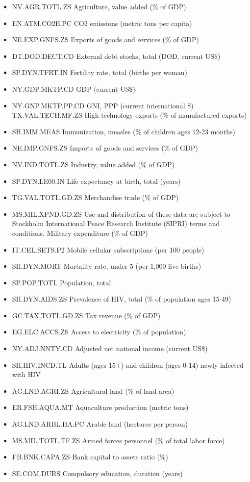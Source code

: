 \begin{itemize}
\tightlist
\item
  NV.AGR.TOTL.ZS Agriculture, value added (\% of GDP)
\item
  EN.ATM.CO2E.PC CO2 emissions (metric tons per capita)
\item
  NE.EXP.GNFS.ZS Exports of goods and services (\% of GDP)
\item
  DT.DOD.DECT.CD External debt stocks, total (DOD, current US\$)
\item
  SP.DYN.TFRT.IN Fertility rate, total (births per woman)
\item
  NY.GDP.MKTP.CD GDP (current US\$)
\item
  NY.GNP.MKTP.PP.CD GNI, PPP (current international \$)
  TX.VAL.TECH.MF.ZS High-technology exports (\% of manufactured exports)
\item
  SH.IMM.MEAS Immunization, measles (\% of children ages 12-23 months)
\item
  NE.IMP.GNFS.ZS Imports of goods and services (\% of GDP)
\item
  NV.IND.TOTL.ZS Industry, value added (\% of GDP)
\item
  SP.DYN.LE00.IN Life expectancy at birth, total (years)
\item
  TG.VAL.TOTL.GD.ZS Merchandise trade (\% of GDP)
\item
  MS.MIL.XPND.GD.ZS Use and distribution of these data are subject to Stockholm International Peace Research Institute (SIPRI) terms and conditions. Military expenditure (\% of GDP)
\item
  IT.CEL.SETS.P2 Mobile cellular subscriptions (per 100 people)
\item
  SH.DYN.MORT Mortality rate, under-5 (per 1,000 live births)
\item
  SP.POP.TOTL Population, total
\item
  SH.DYN.AIDS.ZS Prevalence of HIV, total (\% of population ages 15-49)
\item
  GC.TAX.TOTL.GD.ZS Tax revenue (\% of GDP)
\item
  EG.ELC.ACCS.ZS Access to electricity (\% of population)
\item
  NY.ADJ.NNTY.CD Adjusted net national income (current US\$)
\item
  SH.HIV.INCD.TL Adults (ages 15+) and children (ages 0-14) newly infected with HIV
\item
  AG.LND.AGRI.ZS Agricultural land (\% of land area)
\item
  ER.FSH.AQUA.MT Aquaculture production (metric tons)
\item
  AG.LND.ARBL.HA.PC Arable land (hectares per person)
\item
  MS.MIL.TOTL.TF.ZS Armed forces personnel (\% of total labor force)
\item
  FB.BNK.CAPA.ZS Bank capital to assets ratio (\%)
\item
  SE.COM.DURS Compulsory education, duration (years)
\end{itemize}

